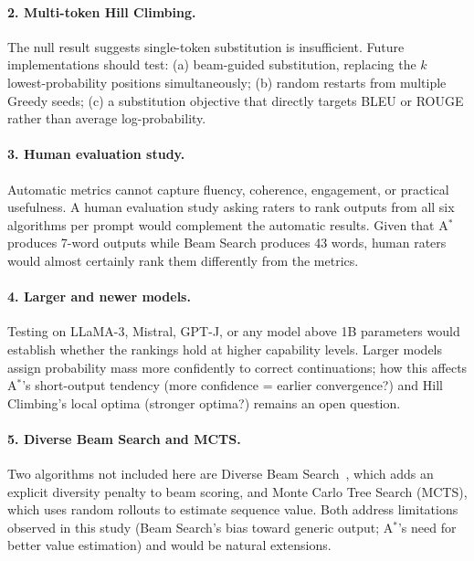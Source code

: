 \documentclass[12pt]{article}
\begin{document}
	\paragraph{2. Multi-token Hill Climbing.}
	The null result suggests single-token substitution is insufficient. Future implementations should test: (a) beam-guided substitution, replacing the $k$ lowest-probability positions simultaneously; (b) random restarts from multiple Greedy seeds; (c) a substitution objective that directly targets BLEU or ROUGE rather than average log-probability.
	
	\paragraph{3. Human evaluation study.}
	Automatic metrics cannot capture fluency, coherence, engagement, or practical usefulness. A human evaluation study asking raters to rank outputs from all six algorithms per prompt would complement the automatic results. Given that A$^*$ produces 7-word outputs while Beam Search produces 43 words, human raters would almost certainly rank them differently from the metrics.
	
	\paragraph{4. Larger and newer models.}
	Testing on LLaMA-3, Mistral, GPT-J, or any model above 1B parameters would establish whether the rankings hold at higher capability levels. Larger models assign probability mass more confidently to correct continuations; how this affects A$^*$'s short-output tendency (more confidence = earlier convergence?) and Hill Climbing's local optima (stronger optima?) remains an open question.
	
	\paragraph{5. Diverse Beam Search and MCTS.}
	Two algorithms not included here are Diverse Beam Search~\cite{vijayakumar2018diverse}, which adds an explicit diversity penalty to beam scoring, and Monte Carlo Tree Search (MCTS), which uses random rollouts to estimate sequence value. Both address limitations observed in this study (Beam Search's bias toward generic output; A$^*$'s need for better value estimation) and would be natural extensions.
	
	\newpage
	\appendix
	
\end{document}
